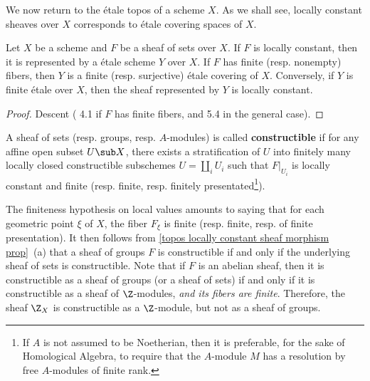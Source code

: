We now return to the \'etale topos of a scheme $X$. As we shall see,  locally constant sheaves over $X$ corresponds to \'etale covering spaces of $X$.
\begin{proposition}\label{scheme etale locally constant sheaf represented by etale cover}
Let $X$ be a scheme and $F$ be a sheaf of sets over $X$. If $F$ is locally constant, then it is represented by a \'etale scheme $Y$ over $X$. If $F$ has finite (resp. nonempty) fibers, then $Y$ is a finite (resp. surjective) \'etale covering of $X$. Conversely, if $Y$ is finite \'etale over $X$, then the sheaf represented by $Y$ is locally constant.
\end{proposition}
\begin{proof}
Descent (\cite{SGA1}  4.1 if $F$ has finite fibers, and \cite{SGA3}  5.4 in the general case).
\end{proof}

\begin{definition}
A sheaf of sets (resp. groups, resp. $A$-modules) is called \textbf{constructible} if for any affine open subset $U\sub X$, there exists a stratification of $U$ into finitely many locally closed constructible subschemes $U=\coprod_iU_i$ such that $F|_{U_i}$ is locally constant and finite (resp. finite, resp. finitely presentated\footnote{If $A$ is not assumed to be Noetherian, then it is preferable, for the sake of Homological Algebra, to require that the $A$-module $M$ has a resolution by free $A$-modules of finite rank.}).
\end{definition}

The finiteness hypothesis on local values amounts to saying that for each geometric point $\xi$ of $X$, the fiber $F_\xi$ is finite (resp. finite, resp. of finite presentation). It then follows from \cref{topos locally constant sheaf morphism prop}~(a) that a sheaf of groups $F$ is constructible if and only if the underlying sheaf of sets is constructible. Note that if $F$ is an abelian sheaf, then it is constructible as a sheaf of groups (or a sheaf of sets) if and only if it is constructible as a sheaf of $\Z$-modules, \textit{and its fibers are finite}. Therefore, the sheaf $\Z_X$ is constructible as a $\Z$-module, but not as a sheaf of groups.


